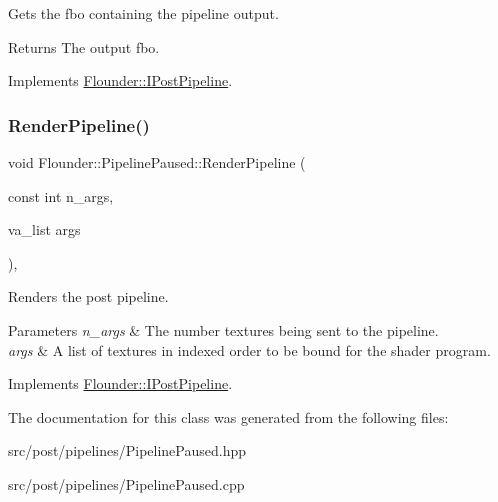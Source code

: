 Gets the fbo containing the pipeline output. 

\begin{DoxyReturn}{Returns}
The output fbo. 
\end{DoxyReturn}


Implements \hyperlink{class_flounder_1_1_i_post_pipeline_a3953881189f3c7876ce4bb5e88f1796c}{Flounder\+::\+I\+Post\+Pipeline}.

\mbox{\label{class_flounder_1_1_pipeline_paused_a7cb1dcc1e1321e725e4292d305bfacc3}} 
\subsubsection{\texorpdfstring{Render\+Pipeline()}{RenderPipeline()}}
{\footnotesize\ttfamily void Flounder\+::\+Pipeline\+Paused\+::\+Render\+Pipeline (\begin{DoxyParamCaption}\item[{const int}]{n\+\_\+args,  }\item[{va\+\_\+list}]{args }\end{DoxyParamCaption})\hspace{0.3cm}{\ttfamily [override]}, {\ttfamily [virtual]}}



Renders the post pipeline. 


\begin{DoxyParams}{Parameters}
{\em n\+\_\+args} & The number textures being sent to the pipeline. \\
\hline
{\em args} & A list of textures in indexed order to be bound for the shader program. \\
\hline
\end{DoxyParams}


Implements \hyperlink{class_flounder_1_1_i_post_pipeline_ad5388fe41486385c55896bdd9439bf60}{Flounder\+::\+I\+Post\+Pipeline}.



The documentation for this class was generated from the following files\+:\begin{DoxyCompactItemize}
\item 
src/post/pipelines/Pipeline\+Paused.\+hpp\item 
src/post/pipelines/Pipeline\+Paused.\+cpp\end{DoxyCompactItemize}
